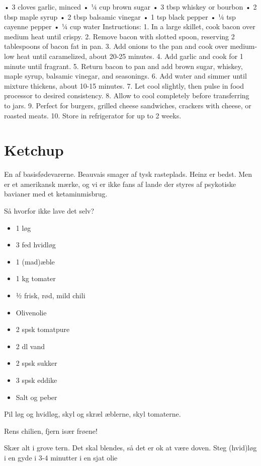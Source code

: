 \documentclass[
]{book}
\providecommand{\tightlist}{%
  \setlength{\itemsep}{0pt}\setlength{\parskip}{0pt}}
\begin{document}
• 3 cloves garlic, minced
• ¼ cup brown sugar
• 3 tbsp whiskey or bourbon
• 2 tbsp maple syrup
• 2 tbsp balsamic vinegar
• 1 tsp black pepper
• ¼ tsp cayenne pepper
• ¼ cup water
Instructions:
1. In a large skillet, cook bacon over medium heat until crispy.
2. Remove bacon with slotted spoon, reserving 2 tablespoons of bacon fat in pan.
3. Add onions to the pan and cook over medium-low heat until caramelized, about 20-25 minutes.
4. Add garlic and cook for 1 minute until fragrant.
5. Return bacon to pan and add brown sugar, whiskey, maple syrup, balsamic vinegar, and seasonings.
6. Add water and simmer until mixture thickens, about 10-15 minutes.
7. Let cool slightly, then pulse in food processor to desired consistency.
8. Allow to cool completely before transferring to jars.
9. Perfect for burgers, grilled cheese sandwiches, crackers with cheese, or roasted meats.
10. Store in refrigerator for up to 2 weeks.

\section{Ketchup}\label{ketchup}

En af basisfødevarerne. Beauvais smager af tysk rasteplads.
Heinz er bedst. Men er et amerikansk mærke, og vi er ikke fans af
lande der styres af psykotiske bavianer med et ketaminmisbrug.

Så hvorfor ikke lave det selv?

\begin{itemize}
\tightlist
\item
  1 løg
\item
  3 fed hvidløg
\item
  1 (mad)æble
\item
  1 kg tomater
\item
  ½ frisk, rød, mild chili
\item
  Olivenolie
\item
  2 spsk tomatpure
\item
  2 dl vand
\item
  2 spsk sukker
\item
  3 spsk eddike
\item
  Salt og peber
\end{itemize}

Pil løg og hvidløg, skyl og skræl æblerne, skyl tomaterne.

Rens chilien, fjern især frøene!

Skær alt i grove tern. Det skal blendes, så det er ok at være doven. Steg (hvid)løg i en gyde i 3-4 minutter i en sjat olie
\end{document}
